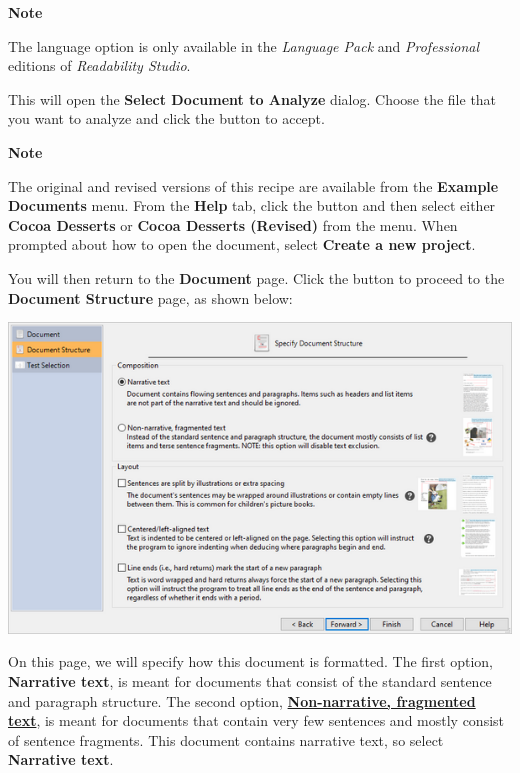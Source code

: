 \documentclass[
]{book}
\newenvironment{notesection}
    {
    \begin{tcolorbox}[colframe=mediumblue,colback=lightblue,coltext=mediumblue,arc=3mm]
    \faLightbulb[regular] \textbf{Note} \newline
    }
    {
    \end{tcolorbox}
    }
\theoremstyle{definition}
\theoremstyle{definition}
\theoremstyle{definition}
\theoremstyle{definition}
\theoremstyle{remark}
\begin{document}
\begin{notesection}
The language option is only available in the \emph{Language Pack} and \emph{Professional} editions of \emph{Readability Studio}.

\end{notesection}

This will open the \textbf{Select Document to Analyze} dialog. Choose the file that you want to analyze and click the  button to accept.

\begin{notesection}
The original and revised versions of this recipe are available from the \textbf{Example Documents} menu. From the \textbf{Help} tab, click the  button and then select either \textbf{Cocoa Desserts} or \textbf{Cocoa Desserts (Revised)} from the menu. When prompted about how to open the document, select \textbf{Create a new project}.

\end{notesection}

You will then return to the \textbf{Document} page. Click the  button to proceed to the \textbf{Document Structure} page, as shown below:

\includegraphics{Images/wizarddocstructure.png}

On this page, we will specify how this document is formatted. The first option, \textbf{Narrative text}, is meant for documents that consist of the standard sentence and paragraph structure. The second option, \protect\hyperlink{framented-text}{\textbf{Non-narrative, fragmented text}}, is meant for documents that contain very few sentences and mostly consist of sentence fragments. This document contains narrative text, so select \textbf{Narrative text}.
\end{document}
